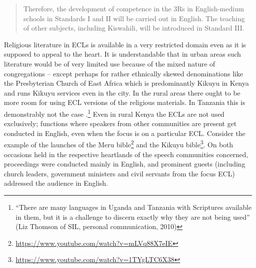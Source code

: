 \documentclass[output=paper,colorlinks,citecolor=brown]{langscibook}
\begin{document}
\begin{quote}
Therefore, the development of competence in the 3Rs in English-medium schools in Standards I and II will be carried out in English. The teaching of other subjects, including Kiswahili, will be introduced in Standard III. \hfill \citep[2]{Tanzania-Government2016} 
\end{quote}

Religious literature in ECLs is available in a very restricted domain even as it is supposed to appeal to the heart. It is understandable that in urban areas such literature would be of very limited use because of the mixed nature of congregations – except perhaps for rather ethnically skewed denominations like the Presbyterian Church of East Africa which is predominantly Kikuyu in Kenya and runs Kikuyu services even in the city. In the rural areas there ought to be more room for using ECL versions of the religious materials. In Tanzania this is demonstrably not the case \citep{Madumulla2007, MuzaleRugemalira2008, Rugemalira2013}.\footnote{“There are many languages in Uganda and Tanzania with Scriptures available in them, but it is a challenge to discern exactly why they are not being used” (Liz Thomson of SIL, personal communication, 2010)} Even in rural Kenya the ECLs are not used exclusively; functions where speakers from other communities are present get conducted in English, even when the focus is on a particular ECL. Consider the example of the launches of the Meru bible\footnote{\url{https://www.youtube.com/watch?v=mLVq88X7eIE}} and the Kikuyu bible\footnote{\url{https://www.youtube.com/watch?v=1TYgLTC6X38}}. On both occasions held in the respective heartlands of the speech communities concerned, proceedings were conducted mainly in English, and prominent guests (including church leaders, government ministers and civil servants from the focus ECL) addressed the audience in English. 
\end{document}
